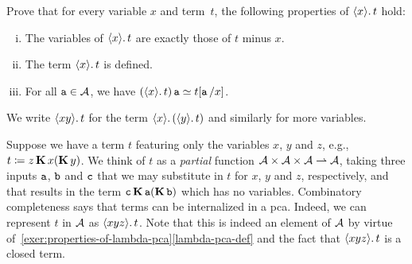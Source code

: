 \begin{exercise}\label{exer:properties-of-lambda-pca}
  Prove that for every variable \(x\) and term~\(t\), the following properties
  of \(\lambdapca{x}{t}\) hold:
  \begin{enumerate}[(i)]
  \item The variables of \(\lambdapca{x}{t}\) are exactly those of \(t\) minus
    \(x\).
  \item\label{lambda-pca-def} The term \(\lambdapca{x}{t}\) is defined.
  \item For all \(\pca{a} \in \AA\), we have
    \((\lambdapca{x}{t})\pca{a} \simeq t[\pca{a}/x]\).
  \end{enumerate}
\end{exercise}

\begin{notation}
  We write \(\lambdapca{xy}{t}\) for the term
  \(\lambdapca{x}({\lambdapca{y}{t}})\) and similarly for more variables.
\end{notation}

Suppose we have a term \(t\) featuring only the variables \(x\), \(y\) and
\(z\), e.g., \(t \coloneqq z\kcomb x(\kcomb y)\).
%
We think of \(t\) as a \emph{partial} function
\(\AA \times \AA \times \AA \pto \AA\), taking three inputs \(\pca{a}\),
\(\pca{b}\) and \(\pca{c}\) that we may substitute in \(t\) for \(x\), \(y\) and
\(z\), respectively, and that results in the term
\(\pca{c}\kcomb\pca{a}(\kcomb\pca{b})\) which has no variables.
%
Combinatory completeness says that terms can be internalized in a pca. Indeed,
we can represent \(t\) in \(\AA\) as \(\lambdapca{xyz}{t}\). Note that this is
indeed an element of \(\AA\) by virtue
of~\cref{exer:properties-of-lambda-pca}\ref{lambda-pca-def} and the fact that
\(\lambdapca{xyz}{t}\) is a closed term.


